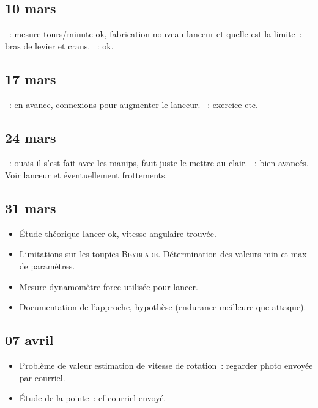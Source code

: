 \documentclass[a4paper, 11pt, final, garamond]{book}
\begin{document}
\subsection{10 mars}
\begin{itemize}
    ~: mesure tours/minute ok, fabrication nouveau lanceur et quelle
        est la limite~: bras de levier et crans.
    ~: ok.
\end{itemize}

\subsection{17 mars}
\begin{itemize}
    ~: en avance, connexions pour augmenter le lanceur.
    ~: exercice etc.
\end{itemize}

\subsection{24 mars}
\begin{itemize}
    ~: ouais il s'est fait avec les manips, faut juste le mettre au
        clair.
    ~: bien avancés. Voir lanceur et éventuellement
        frottements.
\end{itemize}

\subsection{31 mars}
\begin{itemize}
  \item Étude théorique lancer ok, vitesse angulaire trouvée.
  \item Limitations sur les toupies \textsc{Beyblade}. Détermination des valeurs
    min et max de paramètres.
  \item Mesure dynamomètre force utilisée pour lancer.
  \item Documentation de l'approche, hypothèse (endurance meilleure que
    attaque).
\end{itemize}

\subsection{07 avril}
\begin{itemize}
  \item Problème de valeur estimation de vitesse de rotation~: regarder photo
    envoyée par courriel.
  \item Étude de la pointe~: cf courriel envoyé.
\end{itemize}
\end{document}
